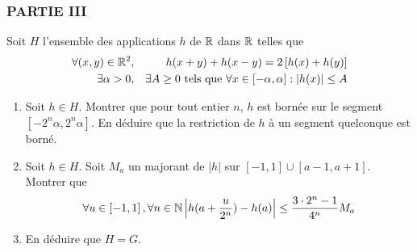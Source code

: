 \subsubsection*{PARTIE III}

Soit $H$ l'ensemble des applications $h$ de $\mathbb{R}$ dans
$\mathbb{R}$ telles que
\begin{align*}
\forall (x,y) \in \mathbb{R}^{2} &,&  h(x+y)+h(x-y)=2\left[
h(x)+h(y)\right] \\
\exists \alpha >0 &,& \exists A\geq 0\text{ tels que }\forall x\in \left[
-\alpha ,\alpha \right] :\left| h(x)\right| \leq A
\end{align*}

\begin{enumerate}
\item  Soit $h\in H$. Montrer que pour tout entier $n$, $h$ est born{\'e}e
sur le segment $\left[ -2^{n}\alpha ,2^{n}\alpha \right] $. En d{\'e}duire
que la restriction de $h$ à un segment quelconque est born{\'e}.

\item  Soit $h\in H$. Soit $M_{a}$ un majorant de $\left| h\right| $ sur $%
\left[ -1,1\right] \cup \left[ a-1,a+1\right] $. Montrer que
\[
\forall u\in \left[ -1,1\right] ,\forall n\in \N \left| h(a+\frac{u}{%
2^{n}})-h(a)\right| \leq \frac{3\cdot 2^{n}-1}{4^{n}}M_{a}
\]

\item  En d{\'e}duire que $H=G$.
\end{enumerate}
